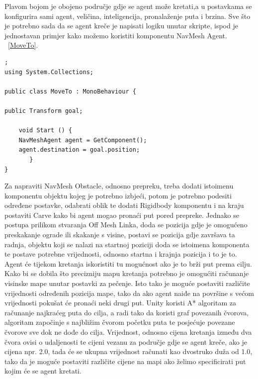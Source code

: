 Plavom bojom je obojeno područje gdje se agent može kretati,a u postavkama se konfigurira sami agent, veličina, inteligencija, pronalaženje puta i brzina. Sve što je potrebno sada da se agent kreče je napisati logiku unutar skripte, ispod je jednostavan primjer kako možemo koristiti komponentu NavMesh Agent. ~\ref{MoveTo}.
\begin{lstlisting}[caption={Korištenje navigacije}, label=MoveTo];
using System.Collections;
    
public class MoveTo : MonoBehaviour {
       
public Transform goal;
       
	void Start () {
	NavMeshAgent agent = GetComponent();
	agent.destination = goal.position; 
       }
}
\end{lstlisting}
Za napraviti NavMesh Obstacle, odnosno prepreku, treba dodati istoimenu komponentu objektu kojeg je potrebno izbjeći, potom je potrebno podesiti određene postavke, odabrati oblik te dodati Rigidbody komponentu i na kraju postaviti Carve kako bi agent mogao pronaći put pored prepreke. Jednako se postupa prilikom stvaranja Off Mesh Linka, doda se pozicija gdje je omogućeno preskakanje ograde ili skakanje s visine, postavi se pozicija gdje završava ta radnja, objektu koji se nalazi na startnoj poziciji doda se istoimena komponenta te postave potrebne vrijednosti, odnosno startna i krajnja pozicija i to je to. Agent će tijekom kretanja iskoristiti tu mogućnost ako je to brži put prema cilju.
Kako bi se dobila što precizniju mapu kretanja potrebno je omogućiti računanje visinske mape unutar postavki za pečenje. Isto tako je moguće postaviti različite vrijednosti određenih pozicija mape, tako da ako agent naiđe na površine s većom vrijednosti pokušat će pronaći neki drugi put. Unity koristi A* algoritam za računanje najkraćeg puta do cilja, a radi tako da koristi graf povezanih čvorova, algoritam započinje s najbližim čvorom početku puta te posjećuje povezane čvorove sve dok ne dođe do cilja. Vrijednost, odnosno cijena kretanja između dva čvora ovisi o udaljenosti te cijeni vezanu za područje gdje se agent kreče, ako je cijena npr. 2.0, tada će se ukupna vrijednost računati kao dvostruko duža od 1.0, tako da je moguće postaviti različite cijene na mapi ako želimo specificirati put kojim će se agent kretati.


